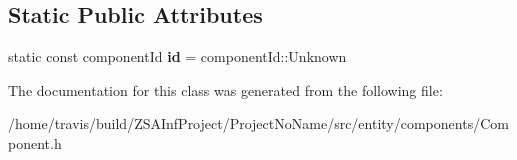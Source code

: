 \subsection*{Static Public Attributes}
\begin{DoxyCompactItemize}
\item 
\hypertarget{classComponent_af71ada3794f6d5a45c2c0823bd6a5cd0}{static const component\-Id {\bfseries id} = component\-Id\-::\-Unknown}\label{classComponent_af71ada3794f6d5a45c2c0823bd6a5cd0}

\end{DoxyCompactItemize}


The documentation for this class was generated from the following file\-:\begin{DoxyCompactItemize}
\item 
/home/travis/build/\-Z\-S\-A\-Inf\-Project/\-Project\-No\-Name/src/entity/components/Component.\-h\end{DoxyCompactItemize}

